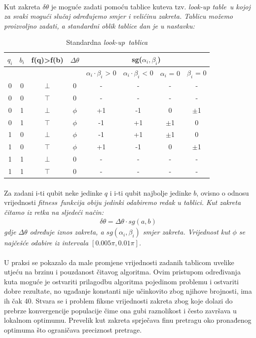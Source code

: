\documentclass[times, utf8, zavrsni, numeric]{fer}
\begin{document}
\paragraph{}
Kut zakreta $\delta\theta$ je moguće zadati pomoću tablice kuteva tzv. \it look-up table\rm\ u kojoj za svaki mogući slučaj određujemo smjer i velićinu zakreta. Tablicu možemo proizvoljno zadati, a standardni oblik tablice dan je u nastavku:
\begin{table}[htb]
\caption{Standardna \it look-up\rm\ tablica}
\label{tbl:lookup}
\centering
\begin{tabular}{|c|c|c|c|c|c|c|c|} 
\hline
$q_i$ & $b_i$ & f(q)>f(b) & $\Delta\theta$ & \multicolumn{4}{|c|}{sg($\alpha_i, \beta_i$)} \\
\hline
&&&& $\alpha_i\cdot\beta_i$ > 0 & $\alpha_i\cdot\beta_i$ < 0 & $\alpha_i$ = 0 & $\beta_i$ = 0 \\
\hline
0 & 0 & $\bot$ & 0 & - & - & - & - \\
0 & 0 & $\top$ & 0 & - & - & - & - \\
0 & 1 & $\bot$ & $\phi$ & +1 & -1 & 0 & $\pm$1 \\
0 & 1 & $\top$ & $\phi$ & -1 & +1 & $\pm$1 & 0 \\
1 & 0 & $\bot$ & $\phi$ & -1 & +1 & $\pm$1 & 0 \\
1 & 0 & $\top$ & $\phi$ & +1 & -1 & 0 & $\pm$1 \\
1 & 1 & $\bot$ & 0 & - & - & - & - \\
1 & 1 & $\top$ & 0 & - & - & - & - \\
\hline
\end{tabular}
\end{table}
\paragraph{}
Za zadani i-ti qubit neke jedinke $q$ i i-ti qubit najbolje jedinke $b$, ovisno o odnosu vrijednosti \it fitness\rm\ funkcija obiju jedinki odabiremo redak u tablici.
Kut zakreta čitamo iz retka na sljedeći način:
\begin{align*}
\delta\theta = \Delta\theta \cdot sg(a,b)
\end{align*}
gdje $\Delta\theta$ određuje iznos zakreta, a $sg(\alpha_i, \beta_i)$ smjer zakreta. Vrijednost kut $\phi$ se najčešće odabire iz intervala $[0.005\pi, 0.01\pi]$.

\paragraph{}
U praksi se pokazalo da male promjene vrijednosti zadanih tablicom uvelike utjeću na brzinu i pouzdanost čitavog algoritma. Ovim pristupom određivanja kuta moguće je ostvariti prilagodbu algoritma pojedinom problemu i ostvariti dobre rezultate, no ugađanje konstanti nije učinkovito zbog njihove brojnosti, ima ih čak 40. Stvara se i problem fiksne vrijednosti zakreta zbog koje dolazi do prebrze konvergencije populacije čime ona gubi raznolikost i često završava u lokalnom optimumu. Prevelik kut zakreta sprječava finu pretragu oko pronađenog optimuma što ograničava preciznost pretrage.
\end{document}
